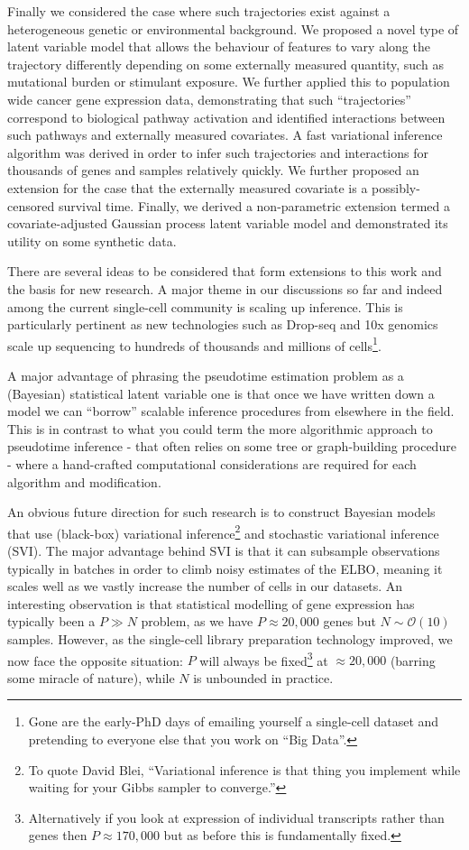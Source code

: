 Finally we considered the case where such trajectories exist against a heterogeneous genetic or environmental background. We proposed a novel type of latent variable model that allows the behaviour of features to vary along the trajectory differently depending on some externally measured quantity, such as mutational burden or stimulant exposure. We further applied this to population wide cancer gene expression data, demonstrating that such ``trajectories'' correspond to biological pathway activation and identified interactions between such pathways and externally measured covariates. A fast variational inference algorithm was derived in order to infer such trajectories and interactions for thousands of genes and samples relatively quickly. We further proposed an extension for the case that the externally measured covariate is a possibly-censored survival time. Finally, we derived a non-parametric extension termed a covariate-adjusted Gaussian process latent variable model and demonstrated its utility on some synthetic data.

There are several ideas to be considered that form extensions to this work and the basis for new research. A major theme in our discussions so far and indeed among the current single-cell community is scaling up inference. This is particularly pertinent as new technologies such as Drop-seq and 10x genomics scale up sequencing to hundreds of thousands and millions of cells\footnote{
   Gone are the early-PhD days of emailing yourself a single-cell dataset and pretending to everyone else that you work on ``Big Data''.
}. 

A major advantage of phrasing the pseudotime estimation problem as a (Bayesian) statistical latent variable one is that once we have written down a model we can ``borrow'' scalable inference procedures from elsewhere in the field. This is in contrast to what you could term the more algorithmic approach to pseudotime inference - that often relies on some tree or graph-building procedure - where a hand-crafted computational considerations are required for each algorithm and modification.

An obvious future direction for such research is to construct Bayesian models that use (black-box) variational inference\footnote{
    To quote David Blei, ``Variational inference is that thing you implement while waiting for your Gibbs sampler to converge.''
} and stochastic variational inference (SVI). The major advantage behind SVI is that it can subsample observations typically in batches in order to climb noisy estimates of the ELBO, meaning it scales well as we vastly increase the number of cells in our datasets. An interesting observation is that statistical modelling of gene expression has typically been a $P \gg N$ problem, as we have $P \approx 20,000$ genes but $N \sim \mathcal{O}(10)$ samples. However, as the single-cell library preparation technology improved, we now face the opposite situation: $P$ will always be fixed\footnote{
Alternatively if you look at expression of individual transcripts rather than genes then $P \approx 170,000$ but as before this is fundamentally fixed.
} at $\approx 20,000$ (barring some miracle of nature), while $N$ is  unbounded in practice.

